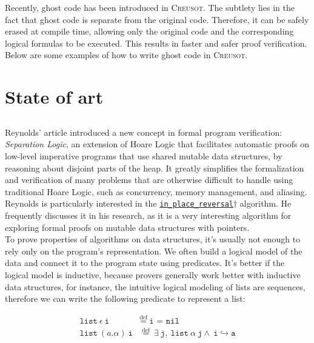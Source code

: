 \documentclass[11pt,a4paper]{article}
\begin{document}
Recently, ghost code has been introduced in \textsc{Creusot}. The subtlety lies in the fact that ghost code is separate from the original code. Therefore, it can be safely erased at compile time, allowing only the original code and the corresponding logical formulas to be executed. This results in faster and safer proof verification. Below are some examples of how to write ghost code in \textsc{Creusot}.

\hypertarget{ghostcode}{}

\section{State of art}

\subsection{}
Reynolds' article introduced a new concept in formal program verification: \emph{Separation Logic}, an extension of Hoare Logic that facilitates automatic proofs on low-level imperative programs that use shared mutable data structures, by reasoning about disjoint parts of the heap. It greatly simplifies the formalization and verification of many problems that are otherwise difficult to handle using traditional Hoare Logic, such as concurrency, memory management, and aliasing.
\\

Reynolds is particularly interested in the \hyperlink{reversal}{\texttt{in\_place\_reversal}$\dagger$} algorithm. He frequently discusses it in his research, as it is a very interesting algorithm for exploring formal proofs on mutable data structures with pointers.
\\

To prove properties of algorithms on data structures, it's usually not enough to rely only on the program's representation. We often build a logical model of the data and connect it to the program state using predicates. It's better if the logical model is inductive, because provers generally work better with inductive data structures, for instance, the intuitive logical modeling of lists are sequences, therefore we can write the following predicate to represent a list:


\begin{align}
\texttt{list}\ \epsilon\ \texttt{i} &\overset{\text{def}}{=}\ \texttt{i = nil} \\
\texttt{list}\ (a.\alpha)\ \texttt{i} &\overset{\text{def}}{=}\ \exists\ \texttt{j},\ \texttt{list}\ \alpha\ \texttt{j} \land\ \texttt{i} \hookrightarrow \texttt{a}
\end{align}
\end{document}
